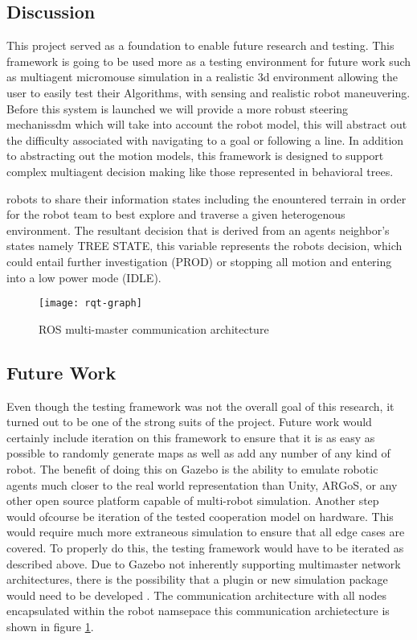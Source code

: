 \subsection{Discussion}
This project served as a foundation to enable future research and testing.
This framework is going to be used more as a testing environment for future work such
as multiagent micromouse simulation in a realistic 3d environment allowing the user to easily test
their Algorithms, with sensing and realistic robot maneuvering. Before this system is launched
we will provide a more robust steering mechanissdm which will take into account the robot model,
this will abstract out the difficulty associated with navigating to a goal or following a line.
In addition to abstracting out the motion models, this framework is designed to support complex
multiagent decision making like those represented in behavioral trees.

robots to share their information states including the enountered
terrain in order for the robot team to best explore and traverse a
given heterogenous environment. The resultant decision that is derived
from an agents neighbor's states namely TREE STATE, this variable
represents the robots decision, which could entail further investigation
(PROD) or stopping all motion and entering into a low power mode (IDLE).


\begin{figure}[H]
  \centering
    \texttt{[image: rqt-graph]}
  \caption{ROS multi-master communication architecture}
  \label{fig:comm}
\end{figure}

\subsection{Future Work}
Even though the testing framework was not the overall goal of this research,
it turned out to be one of the strong suits of the project. Future work would certainly
include iteration on this framework to ensure that it is as easy as possible to
randomly generate maps as well as add any number of any kind of robot. The benefit
of doing this on Gazebo is the ability to emulate robotic agents much closer to the
real world representation than Unity, ARGoS, or any other open source platform
capable of multi-robot simulation. Another step would ofcourse be iteration of the tested cooperation model on hardware.
This would require much more extraneous simulation to ensure that all edge cases are
covered. To properly do this, the testing framework would have to be iterated as
described above. Due to Gazebo not inherently supporting multimaster network architectures,
there is the possibility that a plugin or new simulation package would need to be
developed \cite{ROS-mm}. The communication architecture with all nodes encapsulated within the robot namsepace
this communication archietecture is shown in figure \ref{fig:comm}.
